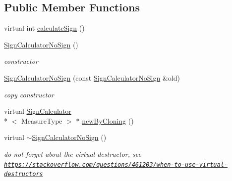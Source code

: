 \subsection*{Public Member Functions}
\begin{DoxyCompactItemize}
\item 
virtual int \hyperlink{class_ox_1_1_sign_calculator_no_sign_a8e78a82d817f66385d1a2140f8ef11d7}{calculate\-Sign} ()
\item 
\hypertarget{class_ox_1_1_sign_calculator_no_sign_ad61e381c257ac4b4f615d94461dc49b1}{\hyperlink{class_ox_1_1_sign_calculator_no_sign_ad61e381c257ac4b4f615d94461dc49b1}{Sign\-Calculator\-No\-Sign} ()}\label{class_ox_1_1_sign_calculator_no_sign_ad61e381c257ac4b4f615d94461dc49b1}

\begin{DoxyCompactList}\small\item\em constructor \end{DoxyCompactList}\item 
\hypertarget{class_ox_1_1_sign_calculator_no_sign_af7d02fdbe8062421741d00f60c9e57aa}{\hyperlink{class_ox_1_1_sign_calculator_no_sign_af7d02fdbe8062421741d00f60c9e57aa}{Sign\-Calculator\-No\-Sign} (const \hyperlink{class_ox_1_1_sign_calculator_no_sign}{Sign\-Calculator\-No\-Sign} \&old)}\label{class_ox_1_1_sign_calculator_no_sign_af7d02fdbe8062421741d00f60c9e57aa}

\begin{DoxyCompactList}\small\item\em copy constructor \end{DoxyCompactList}\item 
virtual \hyperlink{class_ox_1_1_sign_calculator}{Sign\-Calculator}\\*
$<$ Measure\-Type $>$ $\ast$ \hyperlink{class_ox_1_1_sign_calculator_no_sign_ac480086ad668ac264393b1b18a926221}{new\-By\-Cloning} ()
\item 
\hypertarget{class_ox_1_1_sign_calculator_no_sign_a1da2b6c351daf89811c6d9618df2bb74}{virtual \hyperlink{class_ox_1_1_sign_calculator_no_sign_a1da2b6c351daf89811c6d9618df2bb74}{$\sim$\-Sign\-Calculator\-No\-Sign} ()}\label{class_ox_1_1_sign_calculator_no_sign_a1da2b6c351daf89811c6d9618df2bb74}

\begin{DoxyCompactList}\small\item\em do not forget about the virtual destructor, see \href{https://stackoverflow.com/questions/461203/when-to-use-virtual-destructors}{\tt https\-://stackoverflow.\-com/questions/461203/when-\/to-\/use-\/virtual-\/destructors} \end{DoxyCompactList}\end{DoxyCompactItemize}
